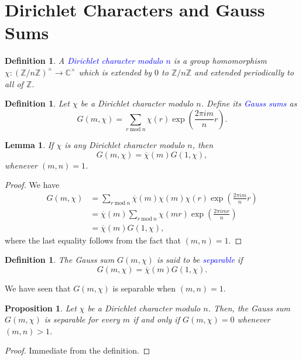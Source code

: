 \documentclass[12pt]{article}
\theoremstyle{thmstyle}
\newtheorem{lemma}[theorem]{Lemma}
\newtheorem{proposition}[theorem]{Proposition}
\theoremstyle{defstyle}
\newtheorem{definition}[theorem]{Definition}
\newcommand{\Z}{\mathbb{Z}}
\newcommand{\bbC}{\mathbb{C}}
\newcommand{\define}[1]{\textcolor{blue}{\textit{#1}}}
\renewcommand{\mod}{~\mathrm{mod}~}
\begin{document}
\section{Dirichlet Characters and Gauss Sums}

\begin{definition}
    A \define{Dirichlet character modulo $n$} is a group homomorphism $\chi:\left(\Z/n\Z\right)^\times\to\bbC^\times$ which is extended by $0$ to $\Z/n\Z$ and extended periodically to all of $\Z$.
\end{definition}

\begin{definition}
    Let $\chi$ be a Dirichlet character modulo $n$. Define its \define{Gauss sums} as
    \begin{equation*}
        G(m,\chi) = \sum_{r\mod n}\chi(r)\exp\left(\frac{2\pi im}{n}r\right).
    \end{equation*}
\end{definition}

\begin{lemma}
    If $\chi$ is any Dirichlet character modulo $n$, then 
    \begin{equation*}
        G(m,\chi) = \overline\chi(m)G(1,\chi),
    \end{equation*}
    whenever $(m,n) = 1$.
\end{lemma}
\begin{proof}
    We have 
    \begin{align*}
        G(m,\chi) &= \sum_{r\mod n}\overline\chi(m)\chi(m)\chi(r)\exp\left(\frac{2\pi im}{n}r\right)\\
        &= \overline\chi(m)\sum_{r\mod n}\chi(mr)\exp\left(\frac{2\pi i mr}{n}\right)\\
        &= \overline\chi(m)G(1,\chi),
    \end{align*}
    where the last equality follows from the fact that $(m,n) = 1$.
\end{proof}

\begin{definition}
    The Gauss sum $G(m,\chi)$ is said to be \define{separable} if 
    \begin{equation*}
        G(m,\chi) = \overline\chi(m)G(1,\chi).
    \end{equation*}
\end{definition}

We have seen that $G(m,\chi)$ is separable when $(m,n) = 1$.

\begin{proposition}
    Let $\chi$ be a Dirichlet character modulo $n$. Then, the Gauss sum $G(m,\chi)$ is separable for every $m$ if and only if $G(m,\chi) = 0$ whenever $(m,n) > 1$.
\end{proposition}
\begin{proof}
    Immediate from the definition.
\end{proof}
\end{document}
